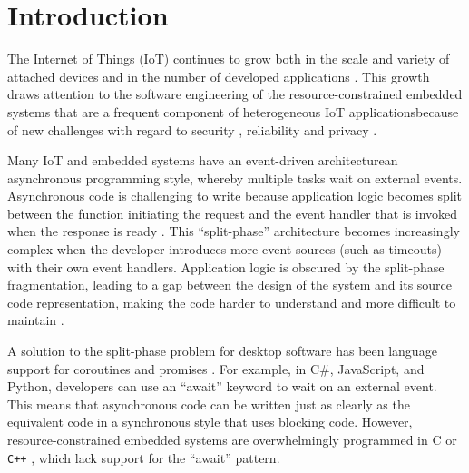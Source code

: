 \section{Introduction}


The Internet of Things (IoT) \cite{Al-Fuqaha2015, Atzori2010, Gubbi2013} continues to grow both in the scale and variety of attached devices and in the number of developed applications \cite{Manyika2015, VanderMeulen2017}. This growth draws attention to the software engineering of the resource-constrained embedded systems that are a frequent component of heterogeneous IoT applications\DIFdelbegin \DIFdel{, }\DIFdelend \DIFaddbegin {}\DIFaddend because of new challenges with regard to security \cite{Sicari2015}, reliability \cite{Gubbi2013} and privacy \cite{Weber2015}.

Many IoT and embedded systems \DIFdelbegin {}\DIFdelend have an event-driven architecture\DIFdelbegin {}\DIFdelend \DIFaddbegin {}\DIFaddend an asynchronous programming style, whereby multiple tasks wait on external events. Asynchronous code is challenging to write because application logic becomes split between the function initiating the request and the event handler that is invoked when the response is ready \cite{Gay2003, Levis2002, Meijer2010}. This “split-phase” architecture becomes increasingly complex when the developer introduces more event sources (such as timeouts) with their own event handlers. \DIFaddbegin {}\DIFaddend Application logic is obscured by the split-phase fragmentation, leading to a gap between the design of the system and its source code representation, making the code harder to understand and more difficult to maintain \cite{Brodu2015, Edwards2009, Madsen2017, Kambona2013}.

A solution to the split-phase problem for desktop software has been language support for coroutines \cite{Conway1963, Knuth1968, Marlin1979} and promises \cite{Brodu2015, Liskov1988, Madsen2017}. For example, in C\#, JavaScript, and Python, developers can use an “await” keyword to wait on an external event. This means that asynchronous code can be written just as clearly as the equivalent code in a synchronous style that uses blocking code. However, resource-constrained embedded systems are overwhelmingly programmed in C or \verb!C++! \cite{AspenCore2017, Skerrett2017}, which lack support for the “await” pattern.

